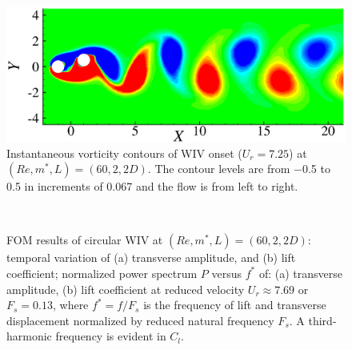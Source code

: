 \begin{figure}
	 \centering
	 \includegraphics[scale=0.45]{circle_re60_m2_onset_vor}
     \caption{Instantaneous vorticity contours of WIV onset ($U_r=7.25$)
      at $(Re,m^*,L)=(60,2,2D)$.
      The contour levels are from −0.5 to 0.5 in increments of 0.067 and the flow is from left to
      right. }
\label{fig:fom_2_onset_vor}
\end{figure}
\begin{figure}
\centering
\begin{subfigure}{0.495\textwidth}
\centering
    \caption{}
    \label{fig:yy}
    \end{subfigure} \\
\begin{subfigure}{0.495\textwidth}
\centering
    \caption{}
    \label{fig:cl}
    \end{subfigure} 
  \caption{FOM results of circular WIV at $(Re,m^*,L)=(60,2,2D)$:
        temporal variation of 
        (a) transverse amplitude, and (b) lift coefficient; 
        normalized power spectrum $P$ versus $f^*$ of: 
        (a) transverse amplitude, (b) lift coefficient at reduced velocity $U_r \approx 7.69$ or $F_s=0.13$, where  $f^*=f/F_s$ 
        is the frequency of lift and transverse displacement normalized 
        by reduced natural frequency $F_s$. 
        A third-harmonic frequency is evident in $C_l$.}
\label{fig:m2_fom}  
\end{figure}

